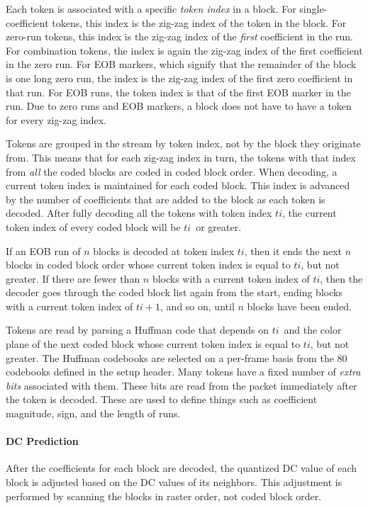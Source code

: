 \documentclass[11pt,letterpaper]{book}
\newcommand{\idx}[1]{{\ensuremath{\mathit{#1}}}}
\newcommand{\ti}{\idx{ti}}
\newcommand{\term}[1]{{\em #1}}
\numberwithin{equation}{chapter}
\numberwithin{figure}{chapter}
\numberwithin{table}{chapter}
\begin{document}
Each token is associated with a specific \term{token index} in a block.
For single-coefficient tokens, this index is the zig-zag index of the token in
 the block.
For zero-run tokens, this index is the zig-zag index of the {\em first}
 coefficient in the run.
For combination tokens, the index is again the zig-zag index of the first
 coefficient in the zero run.
For EOB markers, which signify that the remainder of the block is one long zero
 run, the index is the zig-zag index of the first zero coefficient in that run.
For EOB runs, the token index is that of the first EOB marker in the run.
Due to zero runs and EOB markers, a block does not have to have a token for
 every zig-zag index.

Tokens are grouped in the stream by token index, not by the block they
 originate from.
This means that for each zig-zag index in turn, the tokens with that index from
 {\em all} the coded blocks are coded in coded block order.
When decoding, a current token index is maintained for each coded block.
This index is advanced by the number of coefficients that are added to the
 block as each token is decoded.
After fully decoding all the tokens with token index \ti, the current token
 index of every coded block will be \ti\ or greater.

If an EOB run of $n$ blocks is decoded at token index \ti, then it ends the
 next $n$ blocks in coded block order whose current token index is equal to
 \ti, but not greater.
If there are fewer than $n$ blocks with a current token index of \ti, then the
 decoder goes through the coded block list again from the start, ending blocks
 with a current token index of $\ti+1$, and so on, until $n$ blocks have been
 ended.

Tokens are read by parsing a Huffman code that depends on \ti\ and the color
 plane of the next coded block whose current token index is equal to \ti, but
 not greater.
The Huffman codebooks are selected on a per-frame basis from the 80 codebooks
 defined in the setup header.
Many tokens have a fixed number of \term{extra bits} associated with them.
These bits are read from the packet immediately after the token is decoded.
These are used to define things such as coefficient magnitude, sign, and the
 length of runs.

\paragraph{DC Prediction}

After the coefficients for each block are decoded, the quantized DC value of
 each block is adjusted based on the DC values of its neighbors.
This adjustment is performed by scanning the blocks in raster order, not coded
 block order.
\end{document}
